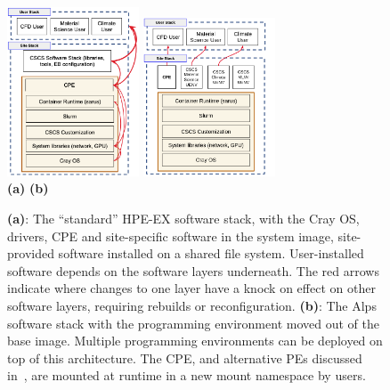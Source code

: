 \begin{figure}[htp!]
    \begin{center}
        \includegraphics[width=0.35\textwidth]{./images/stack-old.png}
        \hspace{2.5cm}
        \includegraphics[width=0.35\textwidth]{./images/stack-new.png}
        \\
        \textbf{(a)} \hspace{9cm} \textbf{(b)}\\
    \end{center}
    \caption{
        \textbf{(a)}:
        The ``standard'' HPE-EX software stack, with the Cray OS, drivers, CPE and site-specific software in the system image, site-provided software installed on a shared file system. 
        User-installed software depends on the software layers underneath.
        The red arrows indicate where changes to one layer have a knock on effect on other software layers, requiring rebuilds or reconfiguration.\newline
        \textbf{(b)}:
        The Alps software stack with the programming environment moved out of the base image.
        Multiple programming environments can be deployed on top of this architecture. The CPE, and alternative PEs discussed in~, are mounted at runtime in a new mount namespace by users.
    }
    \label{fig:stacks}
\end{figure}

